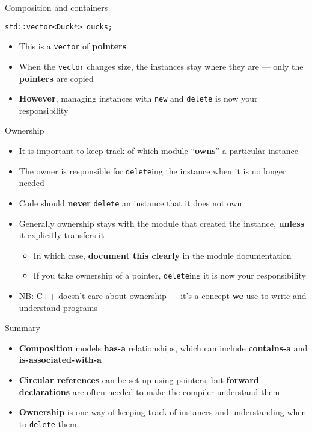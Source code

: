 \begin{frame}[fragile]{Composition and containers}
    \begin{lstlisting}
std::vector<Duck*> ducks;
    \end{lstlisting}
    \pause
    \begin{itemize}
        \item This is a \lstinline{vector} of \textbf{pointers} \pause
        \item When the \lstinline{vector} changes size,
            the instances stay where they are ---
            only the \textbf{pointers} are copied \pause
        \item \textbf{However}, managing instances with \lstinline{new} and \lstinline{delete}
            is now your responsibility
    \end{itemize}
\end{frame}

\begin{frame}{Ownership}
    \begin{itemize}
        \item It is important to keep track of which module ``\textbf{owns}'' a particular instance \pause
        \item The owner is responsible for \lstinline{delete}ing the instance when it is no longer
            needed \pause
        \item Code should \textbf{never} \lstinline{delete} an instance that it does not own \pause
        \item Generally ownership stays with the module that created the instance,
            \textbf{unless} it explicitly transfers it \pause
            \begin{itemize}
                \item In which case, \textbf{document this clearly} in the module documentation \pause
                \item If you take ownership of a pointer, \lstinline{delete}ing it is now your responsibility \pause
            \end{itemize}            
        \item NB: C++ doesn't care about ownership --- it's a concept \textbf{we} use to write and understand programs
    \end{itemize}
\end{frame}

\begin{frame}{Summary}
    \begin{itemize}
        \item \textbf{Composition} models \textbf{has-a} relationships, which can include
            \textbf{contains-a} and \textbf{is-associated-with-a}
        \item \textbf{Circular references} can be set up using pointers,
            but \textbf{forward declarations} are often needed to make the compiler understand them
        \item \textbf{Ownership} is one way of keeping track of instances and understanding
            when to \lstinline{delete} them
    \end{itemize}
\end{frame}
